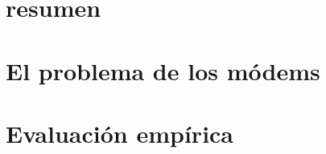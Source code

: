 \documentclass{./packages/informe}
\begin{document}
 



\section*{resumen}


\tableofcontents
\newpage

\section{El problema de los módems}\label{modems}


\vspace{2em}
\section{Evaluación empírica}

\newpage

% 

% 
% 
\end{document}
